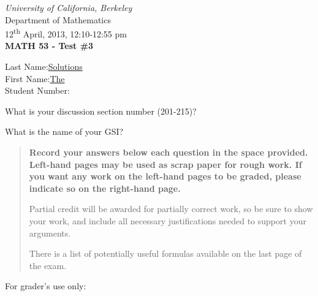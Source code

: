 \documentclass[12pt]{article}
\newcommand{\points}[1]{\marginpar{\hspace{24pt}[#1]}}
\newcommand{\skipline}{\vspace{12pt}}
\begin{document}
\author{Instructor: Sean Fitzpatrick}
\thispagestyle{plain}
\begin{center}
\emph{University of California, Berkeley}\\
Department of Mathematics\\
12\textsuperscript{th} April, 2013, 12:10-12:55 pm\\
{\bf MATH 53 - Test \#3}\\
\end{center}
\skipline \skipline  \noindent \skipline
Last Name:\underline{\hspace{100pt}Solutions\hspace{200pt}}\\
\skipline
First Name:\underline{\hspace{100pt}The\hspace{225pt}}\\
\skipline
Student Number:\underline{\hspace{322pt}}

\skipline
\noindent What is your discussion section number (201-215)?\points{1} \underline{\hspace{144pt}}

\skipline
\noindent What is the name of your GSI?\points{1} \underline{\hspace{245pt}} \\

\vspace{0.5in}


\begin{quote}
 {\bf Record your answers below each question in the space provided.    Left-hand pages may be used as scrap paper for rough work.  If you want any work on the left-hand pages to be graded, please indicate so on the right-hand page.
 
 \bigskip
 
Partial credit will be awarded for partially correct work, so be sure to show your work, and include all necessary justifications needed to support your arguments. 

There is a list of potentially useful formulas available on the last page of the exam.}
\end{quote}


\vspace{0.5in}

For grader's use only:
\end{document}
